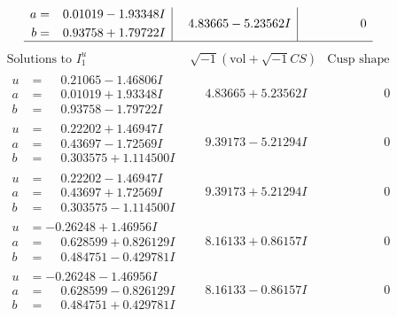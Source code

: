 \documentclass[1p]{elsarticle_modified}
\theoremstyle{definition}
\newcommand{\I}{\sqrt{-1}}
\begin{document}
$$\begin{array}{c|c|c}
\begin{aligned}
a &= \phantom{-}0.01019 - 1.93348 I \\
b &= \phantom{-}0.93758 + 1.79722 I\end{aligned}
 & \phantom{-}4.83665 - 5.23562 I & \phantom{-0.000000 } 0\\
 \hline 
 \end{array}$$\newpage$$\begin{array}{c|c|c}  
\text{Solutions to }I^u_{1}& \I (\text{vol} + \sqrt{-1}CS) & \text{Cusp shape}\\
 \hline 
\begin{aligned}
u &= \phantom{-}0.21065 - 1.46806 I \\
a &= \phantom{-}0.01019 + 1.93348 I \\
b &= \phantom{-}0.93758 - 1.79722 I\end{aligned}
 & \phantom{-}4.83665 + 5.23562 I & \phantom{-0.000000 } 0 \\ \hline\begin{aligned}
u &= \phantom{-}0.22202 + 1.46947 I \\
a &= \phantom{-}0.43697 - 1.72569 I \\
b &= \phantom{-}0.303575 + 1.114500 I\end{aligned}
 & \phantom{-}9.39173 - 5.21294 I & \phantom{-0.000000 } 0 \\ \hline\begin{aligned}
u &= \phantom{-}0.22202 - 1.46947 I \\
a &= \phantom{-}0.43697 + 1.72569 I \\
b &= \phantom{-}0.303575 - 1.114500 I\end{aligned}
 & \phantom{-}9.39173 + 5.21294 I & \phantom{-0.000000 } 0 \\ \hline\begin{aligned}
u &= -0.26248 + 1.46956 I \\
a &= \phantom{-}0.628599 + 0.826129 I \\
b &= \phantom{-}0.484751 - 0.429781 I\end{aligned}
 & \phantom{-}8.16133 + 0.86157 I & \phantom{-0.000000 } 0 \\ \hline\begin{aligned}
u &= -0.26248 - 1.46956 I \\
a &= \phantom{-}0.628599 - 0.826129 I \\
b &= \phantom{-}0.484751 + 0.429781 I\end{aligned}
 & \phantom{-}8.16133 - 0.86157 I & \phantom{-0.000000 } 0 \\ \hline\begin{aligned}

\end{aligned}
\end{array}$$
\end{document}
